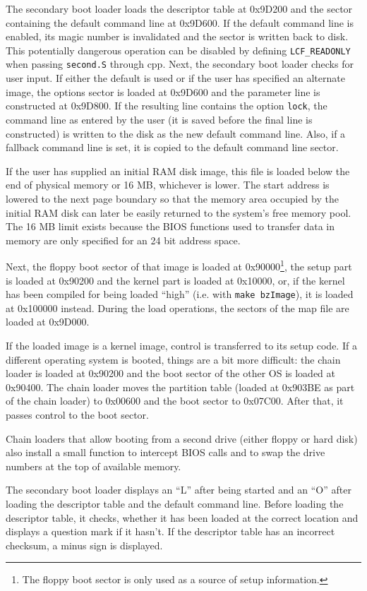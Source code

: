 The secondary boot loader loads the descriptor table at 0x9D200 and the
sector containing the default command line at 0x9D600. If the default command
line is enabled, its magic number is invalidated and the sector is written
back to disk. This potentially dangerous operation can be disabled by defining
{\tt LCF\_READONLY} when passing {\tt second.S} through {\sf cpp}. Next, the
secondary boot loader checks
for user input. If either the default is used or if the user has specified
an alternate image, the options sector is loaded at 0x9D600 and the parameter
line is constructed at 0x9D800. If the resulting line contains the option
\verb"lock", the command line as entered by the user (it is saved before
the final line is constructed) is written to the disk as the new default
command line. Also, if a fallback command line is set, it is copied to the
default command line sector.

If the user has supplied an initial RAM disk image, this file is loaded
below the end of physical memory or 16 MB, whichever is lower. The start
address is lowered to the next page boundary so that the memory area
occupied by the initial RAM disk can later be easily returned to the
system's free memory pool. The 16 MB limit exists because the BIOS
functions used to transfer data in memory are only specified for an 24 bit
address space.

Next, the floppy boot sector of that image is
loaded at 0x90000\footnote{The floppy boot sector is only used as a source of
setup information.},
the setup part is loaded at 0x90200 and
the kernel part is loaded at 0x10000, or, if the kernel has been compiled
for being loaded ``high'' (i.e. with {\tt make bzImage}), it is loaded
at 0x100000 instead. During the load operations, the sectors
of the map file are loaded at 0x9D000.

If the loaded image is a kernel image, control is transferred to
its setup code.
If a different operating system is booted, things are a bit more difficult:
the chain loader is loaded at 0x90200 and the boot sector of the other OS
is loaded at 0x90400. The chain loader moves the partition table (loaded at
0x903BE as part of the chain loader) to 0x00600 and the boot sector to
0x07C00. After that, it passes control to the boot sector.

Chain loaders that allow booting from a second drive (either floppy or hard
disk) also install a small function to intercept BIOS calls and to swap
the drive numbers at the top of available memory.

The secondary boot loader displays an ``L'' after being started and an ``O''
after loading the descriptor table and the default command line. Before
loading the descriptor table, it checks, whether it has been loaded at the
correct location and displays a question mark if it hasn't. If the
descriptor table has an incorrect checksum, a minus sign is displayed.

